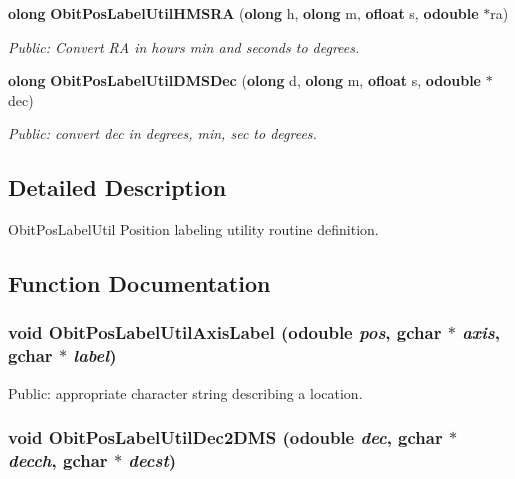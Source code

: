 \begin{CompactItemize}
{\bf olong} {\bf Obit\-Pos\-Label\-Util\-HMSRA} ({\bf olong} h, {\bf olong} m, {\bf ofloat} s, {\bf odouble} $\ast$ra)
\begin{CompactList}\small\item\em Public: Convert RA in hours min and seconds to degrees. \item\end{CompactList}\item 
{\bf olong} {\bf Obit\-Pos\-Label\-Util\-DMSDec} ({\bf olong} d, {\bf olong} m, {\bf ofloat} s, {\bf odouble} $\ast$dec)
\begin{CompactList}\small\item\em Public: convert dec in degrees, min, sec to degrees. \item\end{CompactList}\end{CompactItemize}


\subsection{Detailed Description}
Obit\-Pos\-Label\-Util Position labeling utility routine definition. 



\subsection{Function Documentation}
\subsubsection{\setlength{\rightskip}{0pt plus 5cm}void Obit\-Pos\-Label\-Util\-Axis\-Label ({\bf odouble} {\em pos}, gchar $\ast$ {\em axis}, gchar $\ast$ {\em label})}\label{ObitPosLabelUtil_8h_a0}


Public: appropriate character string describing a location. 

\subsubsection{\setlength{\rightskip}{0pt plus 5cm}void Obit\-Pos\-Label\-Util\-Dec2DMS ({\bf odouble} {\em dec}, gchar $\ast$ {\em decch}, gchar $\ast$ {\em decst})}\label{ObitPosLabelUtil_8h_a2}


